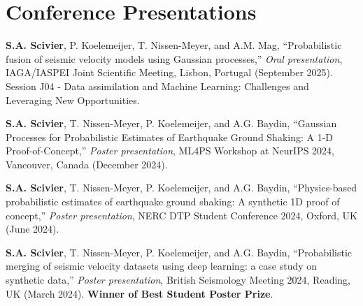 \documentclass[11pt,a4paper]{article}
\begin{document}
\section*{Conference Presentations}
\renewcommand{\labelenumi}{[\arabic{enumi}]}
\begin{etaremune}[itemsep=4pt, start=4]

\item \textbf{S.A. Scivier}, P. Koelemeijer, T. Nissen-Meyer, and A.M. Mag, ``Probabilistic fusion of seismic velocity models using Gaussian processes,'' \textit{Oral presentation}, IAGA/IASPEI Joint Scientific Meeting, Lisbon, Portugal (September 2025). Session J04 - Data assimilation and Machine Learning: Challenges and Leveraging New Opportunities.

\item \textbf{S.A. Scivier}, T. Nissen-Meyer, P. Koelemeijer, and A.G. Baydin, ``Gaussian Processes for Probabilistic Estimates of Earthquake Ground Shaking: A 1-D Proof-of-Concept,'' \textit{Poster presentation}, ML4PS Workshop at NeurIPS 2024, Vancouver, Canada (December 2024).

\item \textbf{S.A. Scivier}, T. Nissen-Meyer, P. Koelemeijer, and A.G. Baydin, ``Physics-based probabilistic estimates of earthquake ground shaking: A synthetic 1D proof of concept,'' \textit{Poster presentation}, NERC DTP Student Conference 2024, Oxford, UK (June 2024).

\item \textbf{S.A. Scivier}, T. Nissen-Meyer, P. Koelemeijer, and A.G. Baydin, ``Probabilistic merging of seismic velocity datasets using deep learning: a case study on synthetic data,'' \textit{Poster presentation}, British Seismology Meeting 2024, Reading, UK (March 2024). \textbf{Winner of Best Student Poster Prize}.

\end{etaremune}
\end{document}
